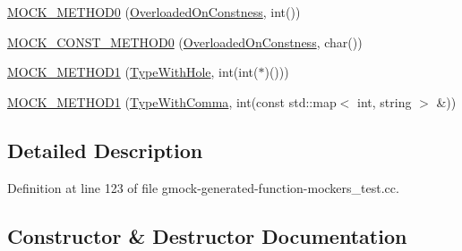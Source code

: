 \begin{DoxyCompactItemize}
\item 
\hyperlink{classtesting_1_1gmock__generated__function__mockers__test_1_1_mock_foo_a291ff46b043d00d0f0acb081c5c36f2e}{M\+O\+C\+K\+\_\+\+M\+E\+T\+H\+O\+D0} (\hyperlink{classtesting_1_1gmock__generated__function__mockers__test_1_1_foo_interface_afbbe6ec72ae237de05e109dea5b03f4f}{Overloaded\+On\+Constness}, int())
\item 
\hyperlink{classtesting_1_1gmock__generated__function__mockers__test_1_1_mock_foo_aa0da575ad3061850662c5f401ddb30c2}{M\+O\+C\+K\+\_\+\+C\+O\+N\+S\+T\+\_\+\+M\+E\+T\+H\+O\+D0} (\hyperlink{classtesting_1_1gmock__generated__function__mockers__test_1_1_foo_interface_afbbe6ec72ae237de05e109dea5b03f4f}{Overloaded\+On\+Constness}, char())
\item 
\hyperlink{classtesting_1_1gmock__generated__function__mockers__test_1_1_mock_foo_a33077a71c1c5178c25b0a4aa099d5f2c}{M\+O\+C\+K\+\_\+\+M\+E\+T\+H\+O\+D1} (\hyperlink{classtesting_1_1gmock__generated__function__mockers__test_1_1_foo_interface_a9e92ef227dc68806f85ebff9c8a6102a}{Type\+With\+Hole}, int(int($\ast$)()))
\item 
\hyperlink{classtesting_1_1gmock__generated__function__mockers__test_1_1_mock_foo_ad07ace4f4288418de7d9740e143da4ef}{M\+O\+C\+K\+\_\+\+M\+E\+T\+H\+O\+D1} (\hyperlink{classtesting_1_1gmock__generated__function__mockers__test_1_1_foo_interface_a654ade1e68b5adb922149898bfe4ccda}{Type\+With\+Comma}, int(const std\+::map$<$ int, string $>$ \&))
\end{DoxyCompactItemize}


\subsection{Detailed Description}


Definition at line 123 of file gmock-\/generated-\/function-\/mockers\+\_\+test.\+cc.



\subsection{Constructor \& Destructor Documentation}
